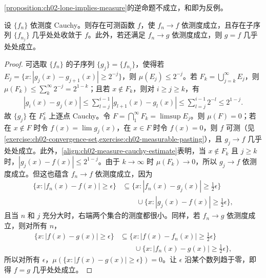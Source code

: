 \documentclass[../../main.tex]{subfiles}%
\begin{document}
\begin{remark}
\cref{proposition:ch02-lone-implies-measure}的逆命题不成立，和即为反例。
\end{remark}
\begin{theorem}\label{theorem:ch02-measure-cauchy-convergence}
设 $\{f_n\}$ 依测度 Cauchy。则存在可测函数 $f$，使 $f_n\to f$ 依测度成立，且存在子序列 $\{f_{n_j}\}$ 几乎处处收敛于 $f$。此外，若还满足 $f_n\to g$ 依测度成立，则 $g=f$ 几乎处处成立。
\end{theorem}
\begin{proof}
可选取 $\{f_n\}$ 的子序列 $\{g_j\}=\{f_{n_j}\}$，使得若 $E_j=\{x:|g_j(x)-g_{j+1}(x)|\ge2^{-j}\}$，则 $\mu(E_j)\le2^{-j}$。若 $F_k=\bigcup_{j=k}^\infty E_j$，则 $\mu(F_k)\le\sum_k^\infty2^{-j}=2^{1-k}$；且若 $x\notin F_k$，则对 $i\ge j\ge k$，有
\begin{align}\label{align:ch02-measure-cauchy-estimate}
|g_i(x)-g_j(x)|\le\sum_{l=j}^{i-1}|g_{l+1}(x)-g_l(x)|\le\sum_{l=j}^{i-1}2^{-l}\le2^{1-j}.
\end{align}
故 $\{g_j\}$ 在 $F_k^c$ 上逐点 Cauchy。令 $F=\bigcap_1^\infty F_k=\limsup E_j$。则 $\mu(F)=0$；若在 $x\notin F$ 时令 $f(x)=\lim g_j(x)$，在 $x\in F$ 时令 $f(x)=0$，则 $f$ 可测（见\cref{exercise:ch02-convergence-set,exercise:ch02-measurable-pasting}），且 $g_j\to f$ 几乎处处成立。此外，\eqref{align:ch02-measure-cauchy-estimate}表明，当 $x\notin F_k$ 且 $j\ge k$ 时，$|g_j(x)-f(x)|\le2^{1-j}$。由于 $k\to\infty$ 时 $\mu(F_k)\to0$，所以 $g_j\to f$ 依测度成立。但这也蕴含 $f_n\to f$ 依测度成立，因为
\begin{align*}
\{x:|f_n(x)-f(x)|\ge\epsilon\}
&\subseteq\{x:|f_n(x)-g_j(x)|\ge\tfrac12\epsilon\}\\
&\qquad\cup\{x:|g_j(x)-f(x)|\ge\tfrac12\epsilon\},
\end{align*}
且当 $n$ 和 $j$ 充分大时，右端两个集合的测度都很小。同样，若 $f_n\to g$ 依测度成立，则对所有 $n$，
\begin{align*}
\{x:|f(x)-g(x)|\ge\epsilon\}
&\subseteq\{x:|f(x)-f_n(x)|\ge\tfrac12\epsilon\}\\
&\qquad\cup\{x:|f_n(x)-g(x)|\ge\tfrac12\epsilon\},
\end{align*}
所以对所有 $\epsilon$，$\mu(\{x:|f(x)-g(x)|\ge\epsilon\})=0$。让 $\epsilon$ 沿某个数列趋于零，即得 $f=g$ 几乎处处成立。
\end{proof}
\end{document}
